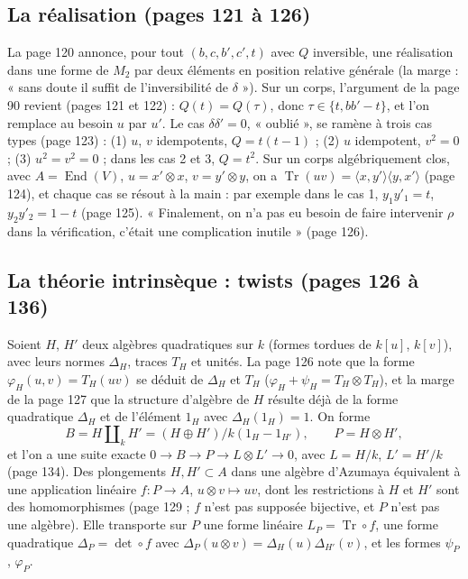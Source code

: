 \documentclass[11pt,a4paper]{article}
\begin{document}
\subsection*{La réalisation (pages 121 à 126)}

La page 120 annonce, pour tout $(b, c, b', c', t)$ avec $Q$ inversible, une
réalisation dans une forme de $M_2$ par deux éléments en position relative
générale (la marge : « sans doute il suffit de l'inversibilité de $\delta$ »).
Sur un corps, l'argument de la page 90 revient (pages 121 et 122) : $Q(t) =
Q(\tau)$, donc $\tau \in \{t, bb' - t\}$, et l'on remplace au besoin $u$ par
$u'$. Le cas $\delta\delta' = 0$, « oublié », se ramène à trois cas types (page
123) : (1) $u$, $v$ idempotents, $Q = t(t - 1)$ ; (2) $u$ idempotent, $v^2 = 0$ ;
(3) $u^2 = v^2 = 0$ ; dans les cas 2 et 3, $Q = t^2$. Sur un corps
algébriquement clos, avec $A = \operatorname{End}(V)$, $u = x' \otimes x$, $v =
y' \otimes y$, on a $\operatorname{Tr}(uv) = \langle x, y'\rangle\langle y,
x'\rangle$ (page 124), et chaque cas se résout à la main : par exemple dans le
cas 1, $y_1y'_1 = t$, $y_2y'_2 = 1 - t$ (page 125). « Finalement, on n'a pas eu
besoin de faire intervenir $\rho$ dans la vérification, c'était une
complication inutile » (page 126).

\subsection*{La théorie intrinsèque : twists (pages 126 à 136)}

Soient $H$, $H'$ deux algèbres quadratiques sur $k$ (formes tordues de
$k[u]$, $k[v]$), avec leurs normes $\Delta_H$, traces $T_H$ et unités. La page
126 note que la forme $\varphi_H(u, v) = T_H(uv)$ se déduit de $\Delta_H$ et
$T_H$ ($\varphi_H + \psi_H = T_H \otimes T_H$), et la marge de la page 127 que
la structure d'algèbre de $H$ résulte déjà de la forme quadratique $\Delta_H$
et de l'élément $1_H$ avec $\Delta_H(1_H) = 1$. On forme
\[
  B = H \amalg_k H' = (H \oplus H')/k(1_H - 1_{H'}),\qquad P = H \otimes H',
\]
et l'on a une suite exacte $0 \to B \to P \to L \otimes L' \to 0$, avec $L =
H/k$, $L' = H'/k$ (page 134). Des plongements $H, H' \subset A$ dans une algèbre
d'Azumaya équivalent à une application linéaire $f : P \to A$, $u \otimes v
\mapsto uv$, dont les restrictions à $H$ et $H'$ sont des homomorphismes
(page 129 ; $f$ n'est pas supposée bijective, et $P$ n'est pas une algèbre).
Elle transporte sur $P$ une forme linéaire $L_P = \operatorname{Tr} \circ f$,
une forme quadratique $\Delta_P = \det \circ f$ avec $\Delta_P(u \otimes v) =
\Delta_H(u)\Delta_{H'}(v)$, et les formes $\psi_P$, $\varphi_P$.
\end{document}
